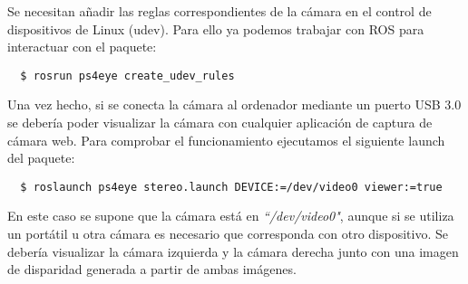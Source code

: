 Se necesitan añadir las reglas correspondientes de la cámara en el control de
dispositivos de Linux (udev). Para ello ya podemos trabajar con ROS para
interactuar con el paquete:
\\
\begin{lstlisting}
  $ rosrun ps4eye create_udev_rules
\end{lstlisting}

Una vez hecho, si se conecta la cámara al ordenador mediante un puerto USB 3.0
se debería poder visualizar la cámara con cualquier aplicación de captura de
cámara web. Para comprobar el funcionamiento ejecutamos el siguiente launch del
paquete:
\\
\begin{lstlisting}
  $ roslaunch ps4eye stereo.launch DEVICE:=/dev/video0 viewer:=true
\end{lstlisting}

En este caso se supone que la cámara está en \textit{``/dev/video0"}, aunque si
se utiliza un portátil u otra cámara es necesario que corresponda con otro
dispositivo. Se debería visualizar la cámara izquierda y la cámara derecha junto
con una imagen de disparidad generada a partir de ambas imágenes.

